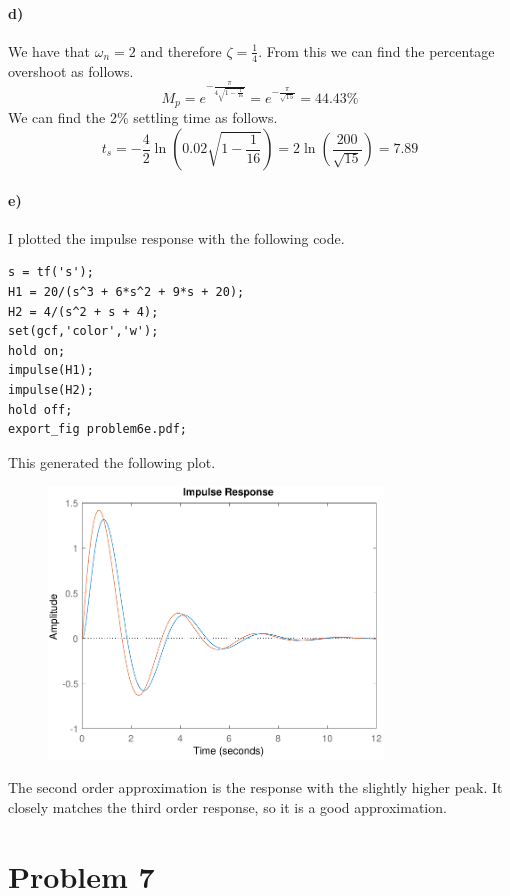\documentclass[12pt]{article}
\begin{document}
\paragraph{d)}

We have that \(\omega_n=2\) and therefore \(\zeta=\frac{1}{4}\). From this we can find the percentage overshoot as follows.
\[M_p=e^{-\frac{\pi}{4\sqrt{1-\frac{1}{16}}}}=e^{-\frac{\pi}{\sqrt{15}}}=44.43\%\]
We can find the 2\% settling time as follows.
\[t_s=-\frac{4}{2}\ln\left(0.02\sqrt{1-\frac{1}{16}}\right)=2\ln\left(\frac{200}{\sqrt{15}}\right)=7.89\]

\paragraph{e)}

I plotted the impulse response with the following code.
\begin{verbatim}
s = tf('s');
H1 = 20/(s^3 + 6*s^2 + 9*s + 20);
H2 = 4/(s^2 + s + 4);
set(gcf,'color','w');
hold on;
impulse(H1);
impulse(H2);
hold off;
export_fig problem6e.pdf;
\end{verbatim}
This generated the following plot.
\begin{figure}[H]
    \begin{center}
        \includegraphics[width=3.5in]{problem6e.pdf}
    \end{center}
\end{figure}
The second order approximation is the response with the slightly higher peak. It closely matches the third order response, so
it is a good approximation.

\section*{Problem 7}
\end{document}
